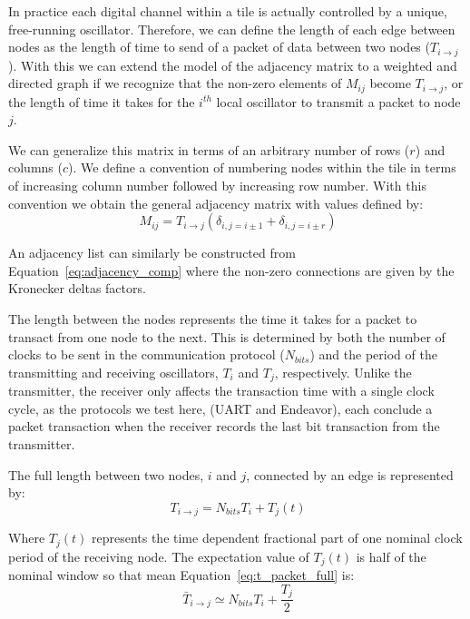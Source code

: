 In practice each digital channel within a tile is actually controlled by a unique, free-running oscillator.
Therefore, we can define the length of each edge between nodes as the length of time to send of a packet of data between two nodes ($T_{i\rightarrow j}$).
With this we can extend the model of the adjacency matrix to a weighted and directed graph if we recognize that the non-zero elements of $M_{ij}$ become $T_{i\rightarrow j}$, or the length of time it takes for the $i^{th}$ local oscillator to transmit a packet to node $j$.

We can generalize this matrix in terms of an arbitrary number of rows ($r$) and columns ($c$).
We define a convention of numbering nodes within the tile in terms of increasing column number followed by increasing row number.
With this convention we obtain the general adjacency matrix with values defined by:
\begin{equation}~\label{eq:adjacency_comp}
  M_{ij} = T_{i\rightarrow j}(\delta_{i,j=i\pm 1} + \delta_{i,j=i\pm r})
\end{equation}

An adjacency list can similarly be constructed from Equation~\ref{eq:adjacency_comp} where the non-zero connections are given by the Kronecker deltas factors.

The length between the nodes represents the time it takes for a packet to transact from one node to the next.
This is determined by both the number of clocks to be sent in the communication protocol ($N_{bits}$) and the period of the transmitting and receiving oscillators, $T_{i}$ and $T_{j}$, respectively.
Unlike the transmitter, the receiver only affects the transaction time with a single clock cycle, as the protocols we test here, (UART and Endeavor), each conclude a packet transaction when the receiver records the last bit transaction from the transmitter.

The full length between two nodes, $i$ and $j$, connected by an edge is represented by:
\begin{equation}~\label{eq:t_packet_full}
T_{i\rightarrow j} = N_{bits}T_{i} + T_{j}(t)
\end{equation}

Where $T_{j}(t)$ represents the time dependent fractional part of one nominal clock period of the receiving node.
The expectation value of $T_{j}(t)$ is half of the nominal window so that mean Equation~\ref{eq:t_packet_full} is:
\begin{equation}~\label{eq:t_packet_avg}
\bar{T}_{i\rightarrow j} \simeq N_{bits}T_{i} + \frac{T_{j}}{2}
\end{equation}


